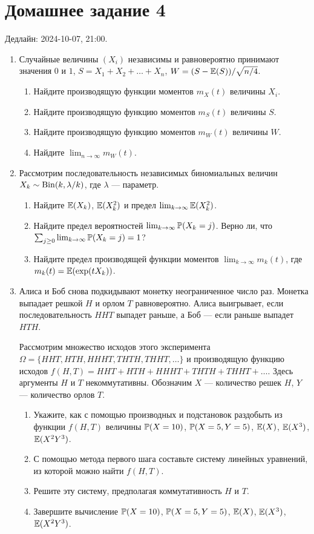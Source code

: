 \section*{Домашнее задание 4}

Дедлайн: 2024-10-07, 21:00.

\begin{enumerate}
\item Случайные величины $(X_i)$ независимы и равновероятно принимают значения $0$ и $1$,
$S = X_1 + X_2 + \dots + X_n$, $W = (S - \E(S)) / \sqrt{n/4}$.

\begin{enumerate}
    \item Найдите производящую функции моментов $m_X(t)$ величины $X_i$.
    \item Найдите производящую функцию моментов $m_S(t)$ величины $S$.
    \item Найдите производящую функцию моментов $m_W(t)$ величины $W$.
    \item Найдите $\lim_{n\to\infty} m_W(t)$.
\end{enumerate}

\item Рассмотрим последовательность независимых биномиальных величин $X_k \sim \dBin(k, \lambda/k)$,
где $\lambda$ — параметр. 
\begin{enumerate}
    \item Найдите $\E(X_k)$, $\E(X_k^2)$ и предел $\lim_{k\to\infty} \E(X_k^2)$.
    \item Найдите предел вероятностей $\lim_{k\to\infty} \P(X_k = j)$. Верно ли, что $\sum_{j \geq 0} \lim_{k\to\infty} \P(X_k = j) = 1$?
    \item Найдите предел производящей функции моментов $\lim_{k\to\infty} m_k(t)$, где $m_k(t)= \E(\exp(tX_k))$.
\end{enumerate}

\item Алиса и Боб снова подкидывают монетку неограниченное число раз. 
Монетка выпадает решкой $H$ и орлом $T$ равновероятно. 
Алиса выигрывает, если последовательность $HHT$ выпадет раньше, а Боб — если раньше выпадет $HTH$.

Рассмотрим множество исходов этого эксперимента $\Omega = \{HHT, HTH, HHHT, THTH, THHT, \dots \}$
и производящую функцию исходов $f(H, T) = HHT + HTH + HHHT + THTH + THHT + \dots$.
Здесь аргументы $H$ и $T$ некоммутативны. 
Обозначим $X$ — количество решек $H$, $Y$ — количество орлов $T$.

\begin{enumerate}
    \item Укажите, как с помощью производных и подстановок раздобыть из функции $f(H, T)$ величины $\P(X = 10)$,
    $\P(X = 5, Y=5)$, $\E(X)$, $\E(X^3)$, $\E(X^2Y^3)$.
    \item С помощью метода первого шага составьте систему линейных уравнений, из которой можно найти $f(H, T)$. 
    \item Решите эту систему, предполагая коммутативность $H$ и $T$. 
    \item Завершите вычисление $\P(X = 10)$, $\P(X = 5, Y=5)$, $\E(X)$, $\E(X^3)$, $\E(X^2Y^3)$.
\end{enumerate}


\end{enumerate}
